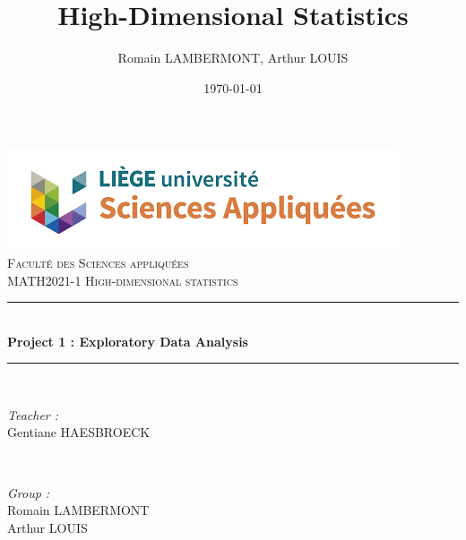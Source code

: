 \documentclass{article}
\begin{document}

\title{High-Dimensional Statistics}								%
\author{Romain LAMBERMONT, Arthur LOUIS}								%
\date{\today}						%

\makeatletter
\let\thetitle\@title
\let\theauthor\@author
\let\thedate\@date
\makeatother

\pagestyle{fancy}
\fancyhf{}
\rhead{\theauthor}
\lhead{\thetitle}
\cfoot{\thepage}

\begin{titlepage}
 \centering
 \vspace*{0.5 cm}
 \includegraphics[scale = 0.7]{figs/facsa.png}\\[1.0 cm]	%
 \textsc{\LARGE \newline\newline Faculté des Sciences appliquées}\\[2.0 cm]	%
 \textsc{\Large MATH2021-1 High-dimensional statistics}\\[0.5 cm]				%
 \rule{\linewidth}{0.2 mm} \\[0.4 cm]
 {\huge \bfseries Project 1 : Exploratory Data Analysis}\\
 \rule{\linewidth}{0.2 mm} \\[1.5 cm]

 \begin{minipage}{0.5\textwidth}
 	\begin{flushleft} \large
 		\emph{Teacher :}\\
 		Gentiane HAESBROECK\\
    \vspace{0.5cm}
 		\end{flushleft}
 		\end{minipage}~
 		\begin{minipage}{0.4\textwidth}

 		\begin{flushright} \large
 		\emph{Group :} \\
    Romain LAMBERMONT\\
    Arthur LOUIS\\
      
 	\end{flushright}

 \end{minipage}\\[2 cm]
 \thedate
\end{titlepage}
\end{document}
